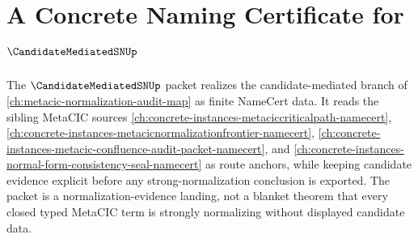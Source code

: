 \chapter{A Concrete Naming Certificate for $\CandidateMediatedSNUp$}
\label{ch:concrete-instances-candidate-mediated-sn-namecert}

The $\CandidateMediatedSNUp$ packet realizes the candidate-mediated branch of \autoref{ch:metacic-normalization-audit-map} as finite NameCert data. It reads the sibling MetaCIC sources \autoref{ch:concrete-instances-metaciccriticalpath-namecert}, \autoref{ch:concrete-instances-metacicnormalizationfrontier-namecert}, \autoref{ch:concrete-instances-metacic-confluence-audit-packet-namecert}, and \autoref{ch:concrete-instances-normal-form-consistency-seal-namecert} as route anchors, while keeping candidate evidence explicit before any strong-normalization conclusion is exported. The packet is a normalization-evidence landing, not a blanket theorem that every closed typed MetaCIC term is strongly normalizing without displayed candidate data.

